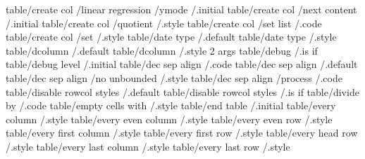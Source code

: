 table/create col                   /linear regression      /ymode               /.initial     
table/create col                   /next content                                /.initial     
table/create col                   /quotient                                    /.style       
table/create col                   /set list                                    /.code        
table/create col                   /set                                         /.style       
table/date type                                                                 /.default     
table/date type                                                                 /.style       
table/dcolumn                                                                   /.default     
table/dcolumn                                                                   /.style 2 args
table/debug                                                                     /.is if       
table/debug level                                                               /.initial     
table/dec sep align                                                             /.code        
table/dec sep align                                                             /.default     
table/dec sep align                /no unbounded                                /.style       
table/dec sep align                /process                                     /.code        
table/disable rowcol styles                                                     /.default     
table/disable rowcol styles                                                     /.is if       
table/divide by                                                                 /.code        
table/empty cells with                                                          /.style       
table/end table                                                                 /.initial     
table/every column                                                              /.style       
table/every even column                                                         /.style       
table/every even row                                                            /.style       
table/every first column                                                        /.style       
table/every first row                                                           /.style       
table/every head row                                                            /.style       
table/every last column                                                         /.style       
table/every last row                                                            /.style       
